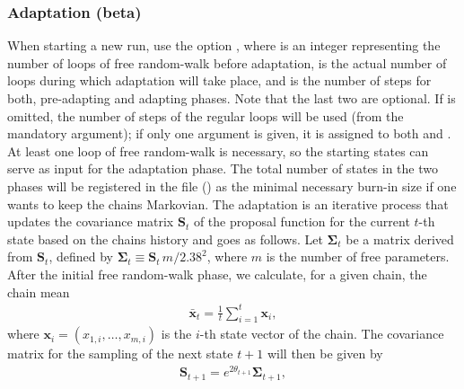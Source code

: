 \documentclass[letterpaper,12pt,english]{sphinxhowto}
\begin{document}
\subsubsection{Adaptation (beta)}
\label{\detokenize{MCMC:adaptation-beta}}
When starting a new run, use the option , where
 is an integer representing the number of loops of free random-walk
before adaptation,  is the actual number of loops during which
adaptation will take place, and  is the number of steps for both,
pre-adapting and adapting phases.
Note that the last two are optional.
If  is omitted, the number of steps of the regular loops will be used
(from the mandatory  argument);
if only one argument is given, it is assigned to both  and .
At least one loop of free random-walk is necessary, so the starting states can
serve as input for the adaptation phase.
The total number of states in the two phases will be registered in the
 file () as the minimal necessary
burn-in size if one wants to keep the chains Markovian.
The adaptation is an iterative process that updates the covariance matrix
\(\mathbf{S}_t\) of the proposal function for the current \(t\)-th
state based on the chains history and goes as follows.
Let \(\mathbf{\Sigma}_t\) be a matrix derived from \(\mathbf{S}_t\), defined by
\(\mathbf{\Sigma}_t \equiv \mathbf{S}_t \, m/2.38^2\), where \(m\) is
the number of free parameters.
After the initial free random-walk phase, we calculate, for a given chain, the chain mean
\begin{equation*}
\begin{split}\mathbf{\bar{x}}_t = \frac{1}{t} \sum_{i=1}^{t} \mathbf{x}_i,\end{split}
\end{equation*}
where \(\mathbf{x}_i = \left(x_{1,i}, \ldots,
x_{m,i}\right)\) is the \(i\)-th state vector of the chain.
The covariance matrix for the sampling of the next state \(t+1\) will then
be given by
\begin{equation*}
\begin{split}\mathbf{S}_{t+1} = e^{2 \theta_{t+1}} \mathbf{\Sigma}_{t+1},\end{split}
\end{equation*}
\end{document}
